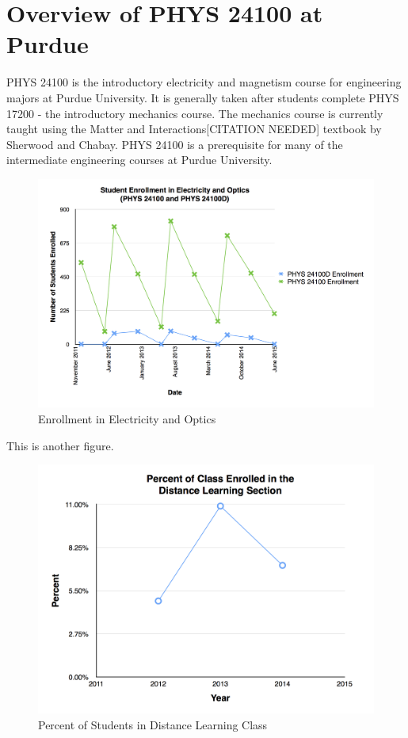 \section{Overview of PHYS 24100 at Purdue}

PHYS 24100 is the introductory electricity and magnetism course for engineering majors at Purdue University. It is generally taken after students complete PHYS 17200 - the introductory mechanics course. The mechanics course is currently taught using the Matter and Interactions[CITATION NEEDED] textbook by Sherwood and Chabay. PHYS 24100 is a prerequisite for many of the intermediate engineering courses at Purdue University.

\begin{figure}[hb]
	\centering
	\includegraphics[width=6in]{img/chapter1/enrollment}
	\caption[Enrollment in Electricity and Optics]{Enrollment in Electricity and Optics}
\end{figure}

This is another figure.

\begin{figure}[hb]
	\centering
	\includegraphics[width=6in]{img/chapter1/percent}
	\caption[Percent of Students in Distance Learning Class]{Percent of Students in Distance Learning Class}
\end{figure}

